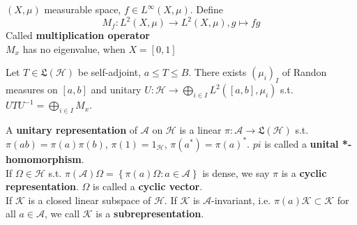 \begin{example}
     $ (X,\mu) $ measurable space,  $ f\in L^\infty(X,\mu) $. Define
     \[M_f:L^2(X,\mu)\rightarrow L^2(X,\mu),g\mapsto fg\]
     Called \textbf{multiplication operator}\\
      $ M_x  $ has no eigenvalue, when  $ X=[0,1] $ 
\end{example}
\begin{theorem}
    Let  $ T\in\mathfrak{L}(\mathcal{H})  $ be self-adjoint,  $ a \leq T \leq B $. There exists  $ (\mu_i)_I $ of Randon measures on  $ [a,b] $  and unitary $ U:\mathcal{H}\rightarrow\bigoplus\limits_{i\in I}L^2([a,b],\mu_i) $ s.t.  $  UTU^{-1}=\bigoplus \limits_{i\in I}M_x $.   
\end{theorem}
\begin{definition}
    A \textbf{unitary representation} of  $ \mathcal{A} $ on  $ \mathcal{H} $ is a linear  $ \pi:\mathcal{A}\rightarrow\mathfrak{L}(\mathcal{H}) $ s.t.  $ \pi(ab)=\pi(a)\pi(b) $,  $ \pi(1)=1_\mathcal{H} $, $ \pi(a^*)=\pi(a)^* $.  $ pi  $ is called a \textbf{unital *-homomorphism}.\\
    If  $ \Omega\in \mathcal{H} $ s.t.  $ \pi(\mathcal{A})\Omega= \left\{ \pi(a)\Omega:a\in\mathcal{A}\right\}  $ is dense, we say  $ \pi  $ is a \textbf{cyclic representation}.  $ \Omega  $ is called a \textbf{cyclic vector}.\\
    If  $ \mathcal{K} $ is a closed linear  subspace of  $ \mathcal{H} $. If  $ \mathcal{K} $ is  $ \mathcal{A} $-invariant, i.e.  $ \pi(a)\mathcal{K}\subset \mathcal{K} $ for all  $ a\in \mathcal{A} $, we call  $ \mathcal{K} $ is a \textbf{subrepresentation}.    
\end{definition}


